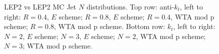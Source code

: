 \begin{figure}[H]
\hfill
{}\hfill
{}\hfill
\caption{LEP2 vs LEP2 MC Jet $N$ distributions. Top row: anti-$k_t$, left to right: $R=0.4$, $E$ scheme; $R=0.8$, $E$ scheme; $R=0.4$, WTA mod p scheme; $R=0.8$, WTA mod p scheme. Bottom row: $k_t$, left to right: $N=2$, $E$ scheme; $N=3$, $E$ scheme; $N=2$, WTA mod p scheme; $N=3$; WTA mod p scheme.}  
\end{figure} 

